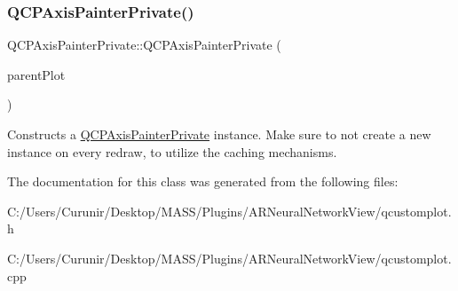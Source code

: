 \subsubsection{\texorpdfstring{Q\+C\+P\+Axis\+Painter\+Private()}{QCPAxisPainterPrivate()}}
{\footnotesize\ttfamily Q\+C\+P\+Axis\+Painter\+Private\+::\+Q\+C\+P\+Axis\+Painter\+Private (\begin{DoxyParamCaption}\item[{\hyperlink{class_q_custom_plot}{Q\+Custom\+Plot} $\ast$}]{parent\+Plot }\end{DoxyParamCaption})\hspace{0.3cm}{\ttfamily [explicit]}}

Constructs a \hyperlink{class_q_c_p_axis_painter_private}{Q\+C\+P\+Axis\+Painter\+Private} instance. Make sure to not create a new instance on every redraw, to utilize the caching mechanisms. 

The documentation for this class was generated from the following files\+:\begin{DoxyCompactItemize}
\item 
C\+:/\+Users/\+Curunir/\+Desktop/\+M\+A\+S\+S/\+Plugins/\+A\+R\+Neural\+Network\+View/qcustomplot.\+h\item 
C\+:/\+Users/\+Curunir/\+Desktop/\+M\+A\+S\+S/\+Plugins/\+A\+R\+Neural\+Network\+View/qcustomplot.\+cpp\end{DoxyCompactItemize}
